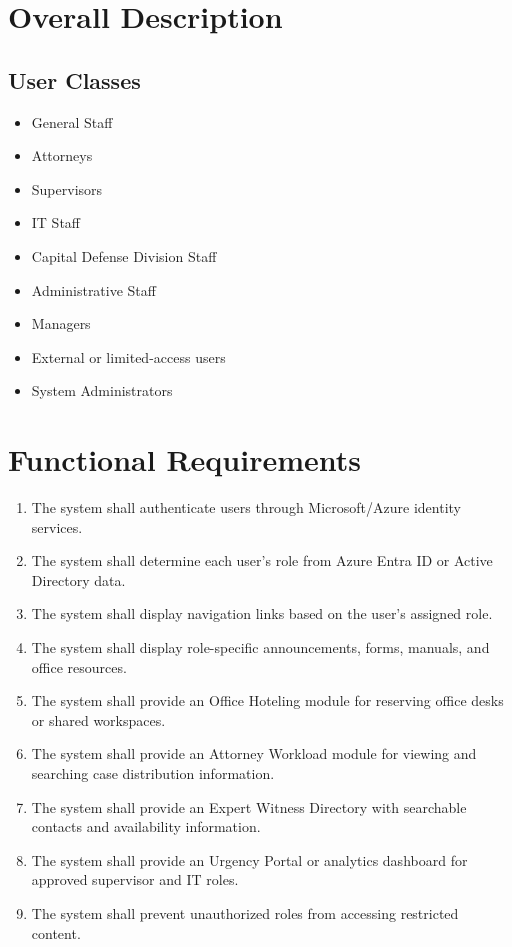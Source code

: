 \documentclass[12pt]{article}
\begin{document}
\section{Overall Description}

\subsection{User Classes}
\begin{itemize}
  \item General Staff
  \item Attorneys
  \item Supervisors
  \item IT Staff
  \item Capital Defense Division Staff
  \item Administrative Staff
  \item Managers
  \item External or limited-access users
  \item System Administrators
\end{itemize}

\section{Functional Requirements}
\begin{enumerate}[label=FR-\arabic*]
  \item The system shall authenticate users through Microsoft/Azure identity services.
  \item The system shall determine each user's role from Azure Entra ID or Active Directory data.
  \item The system shall display navigation links based on the user's assigned role.
  \item The system shall display role-specific announcements, forms, manuals, and office resources.
  \item The system shall provide an Office Hoteling module for reserving office desks or shared workspaces.
  \item The system shall provide an Attorney Workload module for viewing and searching case distribution information.
  \item The system shall provide an Expert Witness Directory with searchable contacts and availability information.
  \item The system shall provide an Urgency Portal or analytics dashboard for approved supervisor and IT roles.
  \item The system shall prevent unauthorized roles from accessing restricted content.
\end{enumerate}
\end{document}
